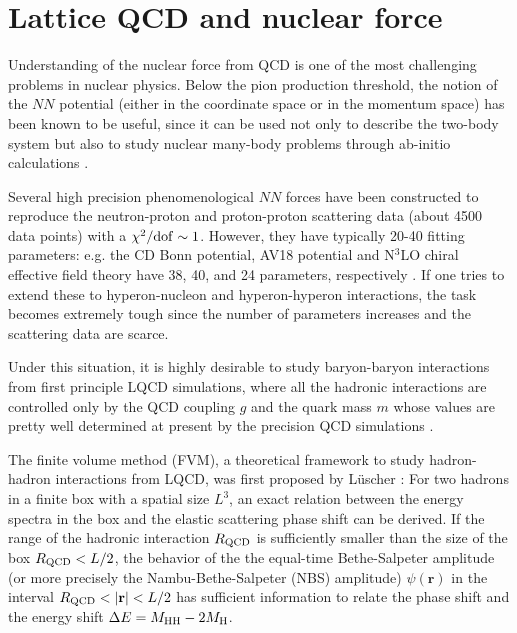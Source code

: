 \section{Lattice QCD and nuclear force}

Understanding of the nuclear force from QCD is one of the most
 challenging problems in nuclear physics.  Below the pion production
 threshold, the notion of the $NN$ potential (either in the coordinate
 space or in the momentum space) has been known to be useful, since it
 can be used not only to describe the two-body system but also to
 study nuclear many-body problems through ab-initio
 calculations \cite{this_book}.

  Several high precision phenomenological $NN$ forces have been
  constructed to reproduce the neutron-proton and proton-proton
  scattering data (about 4500 data points) with a $\chi^2/{\rm
  dof} \sim 1$. However, they have typically 20-40 fitting parameters:
  e.g. the CD Bonn potential, AV18 potential and N$^3$LO chiral
  effective field theory have 38, 40, and 24 parameters,
  respectively \cite{Machleidt:2007ms}.  If one tries to extend these
  to hyperon-nucleon and hyperon-hyperon interactions, the task
  becomes extremely tough since the number of parameters increases and
  the scattering data are scarce.
 
  Under this situation, it is highly desirable to study
  baryon-baryon interactions from first principle LQCD simulations,
  where all the hadronic interactions are controlled only by the QCD
  coupling $g$ and the quark mass $m$ whose values are pretty well
  determined at present by the precision QCD
  simulations \cite{Aoki:2013ldr}.
 
 The finite volume method (FVM), a theoretical framework to study
  hadron-hadron interactions from LQCD, was first proposed by
  L\"{u}scher \cite{luescher}: For two hadrons in a finite box with a
  spatial size $L^3$, an exact relation between the energy spectra in
  the box and the elastic scattering phase shift can be derived.  If
  the range of the hadronic interaction $R_{\rm QCD}$ is sufficiently
  smaller than the size of the box $R_{\rm QCD}<L/2$, the behavior of
  the the equal-time Bethe-Salpeter amplitude (or more precisely the
  Nambu-Bethe-Salpeter (NBS) amplitude) $\psi (\mathbf{r})$ in the
  interval $R_{\rm QCD} < | \mathbf{r} | < L/2 $ has sufficient
  information to relate the phase shift and the energy shift 
$\Delta E=M_{\rm HH}-2M_{\rm H}$.
  
